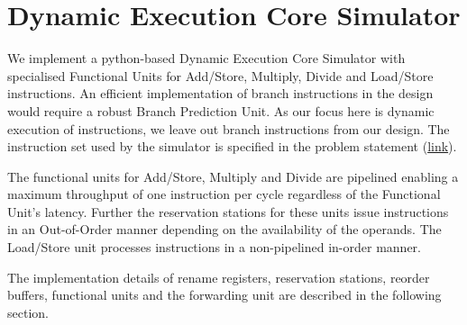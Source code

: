 \documentclass[12pt,a4paper,english]{paper}
\begin{document}
\section{Dynamic Execution Core Simulator}
We implement a python-based Dynamic Execution Core Simulator with specialised Functional Units for Add/Store, Multiply, Divide and Load/Store instructions. An efficient implementation of branch instructions in the design would require a robust Branch Prediction Unit. As our focus here is dynamic execution of instructions, we leave out branch instructions from our design. The instruction set used by the simulator is specified in the problem statement (\href{https://github.com/aklsh/DynamicExecCore/blob/main/handout.pdf}{link}).

The functional units for Add/Store, Multiply and Divide are pipelined enabling a maximum throughput of one instruction per cycle regardless of the Functional Unit's latency. Further the reservation stations for these units issue instructions in an Out-of-Order manner depending on the availability of the operands.
The Load/Store unit processes instructions in a non-pipelined in-order manner.

The implementation details of rename registers, reservation stations, reorder buffers, functional units and the forwarding unit are described in the following section.
\end{document}
